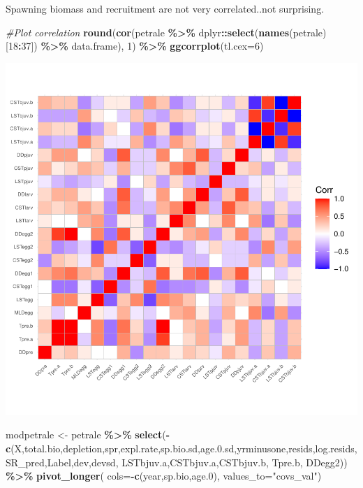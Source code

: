 \documentclass[
]{article}
\newenvironment{Shaded}{\begin{snugshade}}{\end{snugshade}}
\newcommand{\CommentTok}[1]{\textcolor[rgb]{0.56,0.35,0.01}{\textit{#1}}}
\newcommand{\DataTypeTok}[1]{\textcolor[rgb]{0.13,0.29,0.53}{#1}}
\newcommand{\DecValTok}[1]{\textcolor[rgb]{0.00,0.00,0.81}{#1}}
\newcommand{\FloatTok}[1]{\textcolor[rgb]{0.00,0.00,0.81}{#1}}
\newcommand{\KeywordTok}[1]{\textcolor[rgb]{0.13,0.29,0.53}{\textbf{#1}}}
\newcommand{\NormalTok}[1]{#1}
\newcommand{\OperatorTok}[1]{\textcolor[rgb]{0.81,0.36,0.00}{\textbf{#1}}}
\newcommand{\StringTok}[1]{\textcolor[rgb]{0.31,0.60,0.02}{#1}}
\begin{document}
Spawning biomass and recruitment are not very correlated..not
surprising.

\begin{Shaded}
\begin{Highlighting}[]
\CommentTok{\#Plot correlation}
\KeywordTok{round}\NormalTok{(}\KeywordTok{cor}\NormalTok{(petrale }\OperatorTok{\%>\%}\StringTok{ }
\StringTok{            }\NormalTok{dplyr}\OperatorTok{::}\KeywordTok{select}\NormalTok{(}\KeywordTok{names}\NormalTok{(petrale)[}\DecValTok{18}\OperatorTok{:}\DecValTok{37}\NormalTok{]) }\OperatorTok{\%>\%}\StringTok{ }\NormalTok{data.frame), }\DecValTok{1}\NormalTok{) }\OperatorTok{\%>\%}\StringTok{ }
\KeywordTok{ggcorrplot}\NormalTok{(}\DataTypeTok{tl.cex=}\DecValTok{6}\NormalTok{)}
\end{Highlighting}
\end{Shaded}

\includegraphics{calcurr_files/figure-latex/unnamed-chunk-2-1.pdf}

\begin{Shaded}
\begin{Highlighting}[]
\NormalTok{modpetrale <{-}}\StringTok{ }\NormalTok{petrale }\OperatorTok{\%>\%}
\StringTok{  }\KeywordTok{select}\NormalTok{(}\OperatorTok{{-}}\KeywordTok{c}\NormalTok{(X,total.bio,depletion,spr,expl.rate,sp.bio.sd,age.}\FloatTok{0.}\NormalTok{sd,yrminusone,resids,log.resids,SR\_pred,Label,dev,devsd, LSTbjuv.a,CSTbjuv.a,CSTbjuv.b, Tpre.b, DDegg2)) }\OperatorTok{\%>\%}
\StringTok{  }\KeywordTok{pivot\_longer}\NormalTok{(}
    \DataTypeTok{cols=}\OperatorTok{{-}}\KeywordTok{c}\NormalTok{(year,sp.bio,age}\FloatTok{.0}\NormalTok{),}
    \DataTypeTok{values\_to=}\StringTok{"covs\_val"}\NormalTok{)}
\end{Highlighting}
\end{Shaded}
\end{document}
